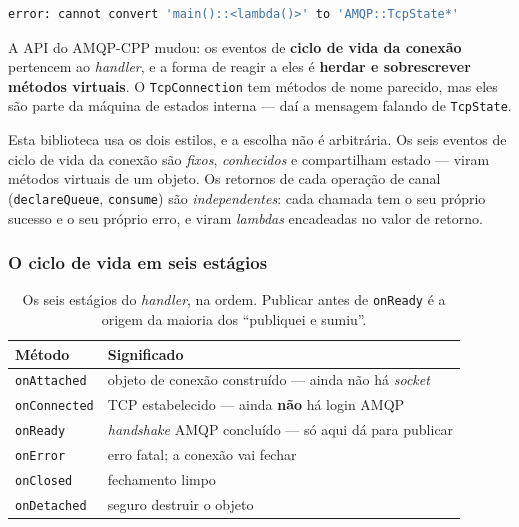 \begin{lstlisting}[style=bt, language=bash,
    caption={A mensagem do compilador --- confusa, porque o método \emph{existe},
             só que com outra assinatura e outro papel.}]
error: cannot convert 'main()::<lambda()>' to 'AMQP::TcpState*'
\end{lstlisting}

A API do AMQP-CPP mudou: os eventos de \textbf{ciclo de vida da conexão}
pertencem ao \emph{handler}, e a forma de reagir a eles é \textbf{herdar e
sobrescrever métodos virtuais}. O \texttt{TcpConnection} tem métodos de nome
parecido, mas eles são parte da máquina de estados interna --- daí a mensagem
falando de \texttt{TcpState}.

\begin{regra}
Esta biblioteca usa os dois estilos, e a escolha não é arbitrária. Os seis
eventos de ciclo de vida da conexão são \emph{fixos}, \emph{conhecidos} e
compartilham estado --- viram métodos virtuais de um objeto. Os retornos de
cada operação de canal (\texttt{declareQueue}, \texttt{consume}) são
\emph{independentes}: cada chamada tem o seu próprio sucesso e o seu próprio
erro, e viram \emph{lambdas} encadeadas no valor de retorno.
\end{regra}

\subsubsection{O ciclo de vida em seis estágios}

\begin{table}[htbp]
\centering
\caption{Os seis estágios do \emph{handler}, na ordem. Publicar antes de
         \texttt{onReady} é a origem da maioria dos ``publiquei e sumiu''.}
\label{tab:amqp-lifecycle}
\footnotesize
\begin{tabular}{@{}ll@{}}
\toprule
\textbf{Método} & \textbf{Significado} \\
\midrule
\texttt{onAttached}  & objeto de conexão construído --- ainda não há \emph{socket} \\
\texttt{onConnected} & TCP estabelecido --- ainda \textbf{não} há login AMQP \\
\texttt{onReady}     & \emph{handshake} AMQP concluído --- só aqui dá para publicar \\
\texttt{onError}     & erro fatal; a conexão vai fechar \\
\texttt{onClosed}    & fechamento limpo \\
\texttt{onDetached}  & seguro destruir o objeto \\
\bottomrule
\end{tabular}
\end{table}

